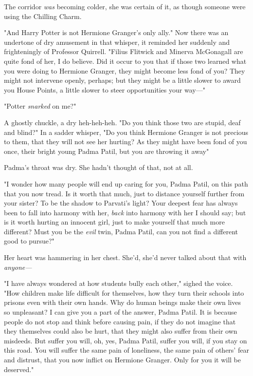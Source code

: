 The corridor \emph{was} becoming colder, she was certain of it, as though
someone were using the Chilling Charm.

"And Harry Potter is not Hermione Granger's only ally." Now there was an
undertone of dry amusement in that whisper, it reminded her suddenly and
frighteningly of Professor Quirrell. "Filius Flitwick and Minerva McGonagall
are quite fond of her, I do believe. Did it occur to you that if those two
learned what you were doing to Hermione Granger, they might become less fond of
you? They might not intervene openly, perhaps; but they might be a little
slower to award you House Points, a little slower to steer opportunities your
way—"

"Potter \emph{snarked} on me?"

A ghostly chuckle, a dry heh-heh-heh. "Do you think those two are stupid, deaf
and blind?" In a sadder whisper, "Do you think Hermione Granger is not precious
to them, that they will not see her hurting? As they might have been fond of
you once, their bright young Padma Patil, but you are throwing it away{\el}"

Padma's throat was dry. She hadn't thought of that, not at all.

"I wonder how many people will end up caring for you, Padma Patil, on this path
that you now tread. Is it worth that much, just to distance yourself further
from your sister? To be the shadow to Parvati's light? Your deepest fear has
always been to fall into harmony with her, \emph{back} into harmony with her I
should say; but is it worth hurting an innocent girl, just to make yourself
that much more different? Must you be the \emph{evil} twin, Padma Patil, can
you not find a different good to pursue?"

Her heart was hammering in her chest. She'd, she'd never talked about that with
\emph{anyone—}

"I have always wondered at how students bully each other," sighed the voice.
"How children make life difficult for themselves, how they turn their schools
into prisons even with their own hands. Why do human beings make their own
lives so unpleasant? I can give you a part of the answer, Padma Patil. It is
because people do not stop and think before causing pain, if they do not
imagine that they themselves could also be hurt, that they might also suffer
from their own misdeeds. But suffer you will, oh, yes, Padma Patil, suffer you
will, if you stay on this road. You will suffer the same pain of loneliness,
the same pain of others' fear and distrust, that you now inflict on Hermione
Granger. Only for you it will be deserved."

